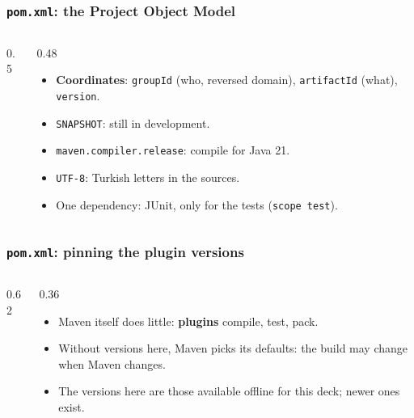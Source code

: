 \documentclass[aspectratio=169,10pt,compress]{beamer}
\begin{document}
\begin{frame}[t,fragile] \frametitle{\texttt{pom.xml}: the Project Object Model}
  \begin{columns}[T]
    \begin{column}{0.5\textwidth}
    \end{column}
    \begin{column}{0.48\textwidth}
      \begin{itemize}\small
        \item \textbf{Coordinates}: \texttt{groupId} (who, reversed domain), \texttt{artifactId} (what), \texttt{version}.
        \item \texttt{SNAPSHOT}: still in development.
        \item \texttt{maven.compiler.release}: compile for Java 21.
        \item \texttt{UTF-8}: Turkish letters in the sources.
        \item One dependency: JUnit, only for the tests (\texttt{scope test}).
      \end{itemize}
    \end{column}
  \end{columns}
\end{frame}




\begin{frame}[t,fragile] \frametitle{\texttt{pom.xml}: pinning the plugin versions}
  \begin{columns}[T]
    \begin{column}{0.62\textwidth}
    \end{column}
    \begin{column}{0.36\textwidth}
      \begin{itemize}\small
        \item Maven itself does little: \textbf{plugins} compile, test, pack.
        \item Without versions here, Maven picks its defaults: the build may change when Maven changes.
        \item The versions here are those available offline for this deck; newer ones exist.
      \end{itemize}
    \end{column}
  \end{columns}
\end{frame}
\end{document}
